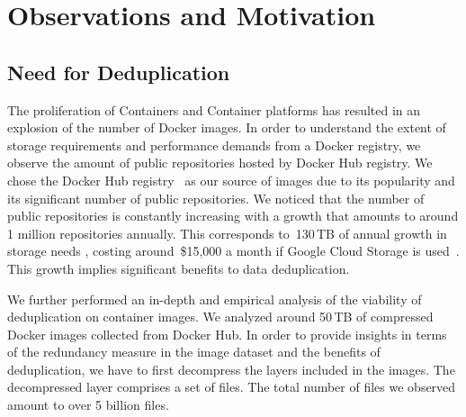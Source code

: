 \section{Observations and Motivation} %
\label{sec:observation}

\subsection{Need for Deduplication}

The proliferation of Containers and Container platforms has resulted in an explosion of the number of Docker images.
In order to understand the extent of storage requirements and performance demands from a Docker registry, 
we observe the amount of public repositories hosted by Docker Hub registry. 
We chose the Docker Hub registry~\cite{docker-hub} as our source of images due to its popularity 
and its significant number of public repositories. 
%
%
%
%
We noticed that the number of public repositories is constantly increasing with a growth that amounts 
to around 1 million repositories annually. 
This corresponds to~130\,TB of annual growth in storage needs , 
costing around~\$15,000 a month if Google Cloud Storage is used~\cite{GoogleCloudStoragePricing}.
This growth implies significant benefits to data deduplication. 

We further performed an in-depth and empirical analysis of the viability of deduplication on container images. 
We analyzed around 50\,TB of compressed Docker images collected from Docker Hub. 
In order to provide insights in terms of the redundancy measure in the image dataset and the benefits of deduplication,
we have to first decompress the layers included in the images. 
The decompressed layer comprises a set of files. 
The total number of files we observed amount to over 5 billion files.



